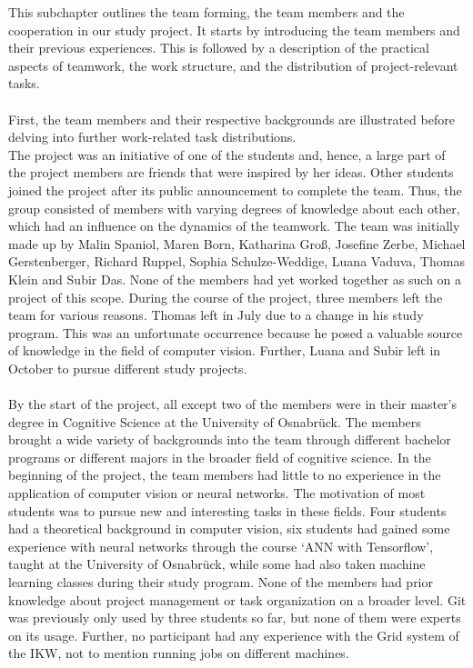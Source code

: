 This subchapter outlines the team forming, the team members and the cooperation in our study project. It starts by introducing the team members and their previous experiences. This is followed by a description of the practical aspects of teamwork, the work structure, and the distribution of project-relevant tasks. \\
\\
First, the team members and their respective backgrounds are illustrated before delving into further work-related task distributions. \\
The project was an initiative of one of the students and, hence, a large part of the project members are friends that were inspired by her ideas. Other students joined the project after its public announcement to complete the team. Thus, the group consisted of members with varying degrees of knowledge about each other, which had an influence on the dynamics of the teamwork. The team was initially made up by Malin Spaniol, Maren Born, Katharina Groß, Josefine Zerbe, Michael Gerstenberger, Richard Ruppel, Sophia Schulze-Weddige, Luana Vaduva, Thomas Klein and Subir Das. None of the members had yet worked together as such on a project of this scope. During the course of the project, three members left the team for various reasons. Thomas left in July due to a change in his study program. This was an unfortunate occurrence because he posed a valuable source of knowledge in the field of computer vision. Further, Luana and Subir left in October to pursue different study projects. \\
\\
By the start of the project, all except two of the members were in their master’s degree in Cognitive Science at the University of Osnabrück. The members brought a wide variety of backgrounds into the team through different bachelor programs or different majors in the broader field of cognitive science.
In the beginning of the project, the team members had little to no experience in the application of computer vision or neural networks. The motivation of most students was to pursue new and interesting tasks in these fields. Four students had a theoretical background in computer vision, six students had gained some experience with neural networks through the course ‘ANN with Tensorflow’, taught at the University of Osnabrück, while some had also taken machine learning classes during their study program. None of the members had prior knowledge about project management or task organization on a broader level. Git was previously only used by three students so far, but none of them were experts on its usage. Further, no participant had any experience with the Grid system of the IKW, not to mention running jobs on different machines. \\
